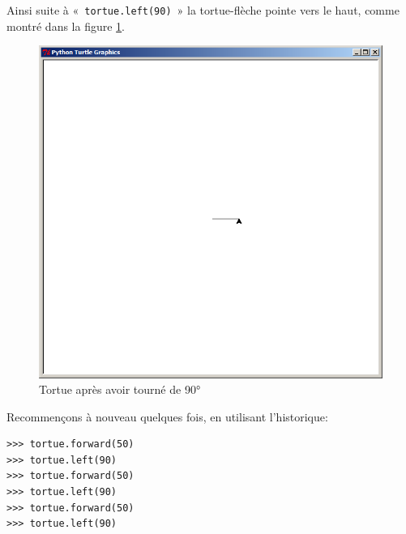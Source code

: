 Ainsi suite à «~\texttt{tortue.left(90)}~»  la tortue-flèche pointe vers le haut, comme montré dans la figure \ref{fig:90l}.
\begin{figure}[!ht]
\centering
\includegraphics[scale=0.3]{images/90l.png}
\caption{Tortue après avoir tourné de 90°}
\label{fig:90l}
\end{figure}

Recommençons à nouveau quelques fois, en utilisant l'historique:

\begin{Verbatim}[frame=single,rulecolor=\color{mbleu}, label=à taper]
>>> tortue.forward(50)
>>> tortue.left(90)
>>> tortue.forward(50)
>>> tortue.left(90)
>>> tortue.forward(50)
>>> tortue.left(90)
\end{Verbatim}

